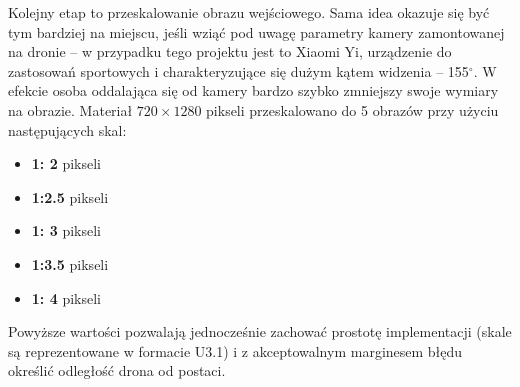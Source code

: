 Kolejny etap to przeskalowanie obrazu wejściowego. 
Sama idea okazuje się być tym bardziej na miejscu, jeśli wziąć pod uwagę parametry kamery zamontowanej na dronie -- w przypadku tego projektu jest to Xiaomi Yi, urządzenie do zastosowań sportowych i charakteryzujące się dużym kątem widzenia -- 155$^{\circ}$. %
W efekcie osoba oddalająca się od kamery bardzo szybko zmniejszy swoje wymiary na obrazie. 
Materiał $720\times 1280$ pikseli przeskalowano do 5 obrazów przy użyciu następujących skal:
\begin{itemize}
	\item \textbf{1:  2}\tab{:} pikseli
	\item \textbf{1:2.5}\tab{:} pikseli	
	\item \textbf{1:  3}\tab{:} pikseli
	\item \textbf{1:3.5}\tab{:} pikseli
	\item \textbf{1:  4}\tab{:} pikseli
\end{itemize}

Powyższe wartości pozwalają jednocześnie zachować prostotę implementacji (skale są reprezentowane w formacie U3.1) i z akceptowalnym marginesem błędu określić odległość drona od postaci. %

